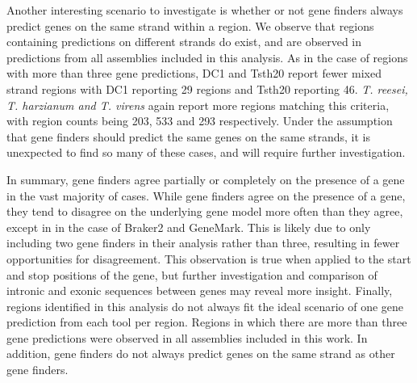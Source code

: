 Another interesting scenario to investigate is whether or not gene
finders always predict genes on the same strand within a region. We
observe that regions containing predictions on different strands do
exist, and are observed in predictions from all assemblies included in
this analysis. As in the case of regions with more than three gene
predictions, DC1 and Tsth20 report fewer mixed strand regions with DC1
reporting 29 regions and Tsth20 reporting 46. \textit{T. reesei,
  T. harzianum and T. virens} again report more regions matching this
criteria, with region counts being 203, 533 and 293
respectively. Under the assumption that gene finders should predict
the same genes on the same strands, it is unexpected to find so many
of these cases, and will require further investigation.

In summary, gene finders agree partially or completely on the presence
of a gene in the vast majority of cases. While gene finders agree on
the presence of a gene, they tend to disagree on the underlying gene
model more often than they agree, except in in the case of Braker2 and
GeneMark. This is likely due to only including two gene finders in
their analysis rather than three, resulting in fewer opportunities for
disagreement. This observation is true when applied to the start and
stop positions of the gene, but further investigation and comparison
of intronic and exonic sequences between genes may reveal more
insight. Finally, regions identified in this analysis do not always
fit the ideal scenario of one gene prediction from each tool per
region. Regions in which there are more than three gene predictions
were observed in all assemblies included in this work. In addition,
gene finders do not always predict genes on the same strand as other
gene finders.

